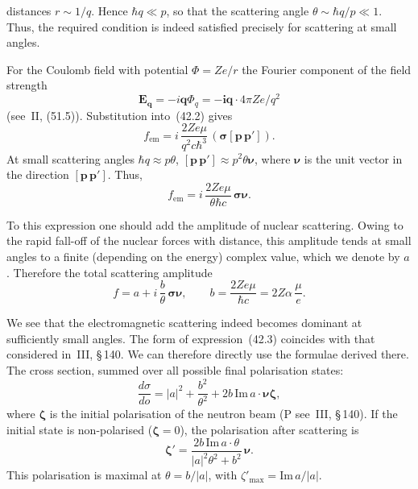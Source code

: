 distances $r \sim 1/q$. Hence $\hbar q \ll p$, so that the scattering angle $\theta \sim \hbar q/p \ll 1$. Thus, the required condition is indeed satisfied precisely for scattering at small angles.

For the Coulomb field with potential $\Phi = Ze/r$ the Fourier component of the field strength
\[
\mathbf{E}_\mathbf{q} = -i\mathbf{q}\Phi_q = -\mathbf{i}\mathbf{q}\cdot 4\pi Ze/q^2
\]
(see~II, (51.5)). Substitution into~(42.2) gives
\[
f_{\mathrm{em}} = i\,\frac{2Ze\mu}{q^2c\hbar^3}\,(\boldsymbol{\sigma}[\mathbf{p}\,\mathbf{p}']).
\]
At small scattering angles $\hbar q \approx p\theta$, $[\mathbf{p}\,\mathbf{p}'] \approx p^2\theta\boldsymbol{\nu}$, where $\boldsymbol{\nu}$ is the unit vector in the direction $[\mathbf{p}\,\mathbf{p}']$. Thus,
\[
f_{\mathrm{em}} = i\,\frac{2Ze\mu}{\theta\hbar c}\,\boldsymbol{\sigma}\boldsymbol{\nu}.
\]

To this expression one should add the amplitude of nuclear scattering. Owing to the rapid fall-off of the nuclear forces with distance, this amplitude tends at small angles to a finite (depending on the energy) complex value, which we denote by $a$. Therefore the total scattering amplitude
\begin{equation}
f = a + i\,\frac{b}{\theta}\,\boldsymbol{\sigma}\boldsymbol{\nu},\qquad b = \frac{2Ze\mu}{\hbar c} = 2Z\alpha\,\frac{\mu}{e}.
\tag{42.3}
\end{equation}

We see that the electromagnetic scattering indeed becomes dominant at sufficiently small angles. The form of expression~(42.3) coincides with that considered in~III, \S\,140. We can therefore directly use the formulae derived there. The cross section, summed over all possible final polarisation states:
\begin{equation}
\frac{d\sigma}{do} = |a|^2 + \frac{b^2}{\theta^2} + 2b\,\mathrm{Im}\,a\cdot\boldsymbol{\nu}\boldsymbol{\zeta},
\tag{42.4}
\end{equation}
where $\boldsymbol{\zeta}$ is the initial polarisation of the neutron beam (P see~III, \S\,140). If the initial state is non-polarised ($\boldsymbol{\zeta} = 0$), the polarisation after scattering is
\begin{equation}
\boldsymbol{\zeta}' = \frac{2b\,\mathrm{Im}\,a\cdot\theta}{|a|^2\theta^2 + b^2}\,\boldsymbol{\nu}.
\tag{42.5}
\end{equation}
This polarisation is maximal at $\theta = b/|a|$, with $\zeta'_{\max} = \mathrm{Im}\,a/|a|$.
